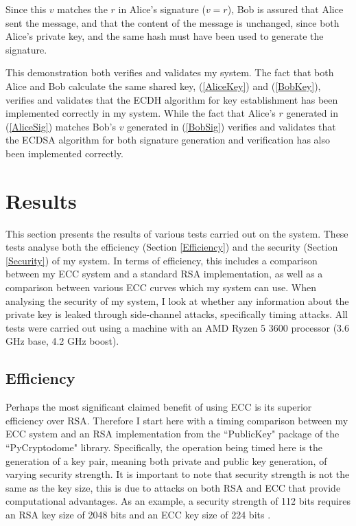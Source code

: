 \documentclass[12pt,a4paper]{article}
\begin{document}
Since this $v$ matches the $r$ in Alice's signature ($v=r$), 
Bob is assured that Alice sent the message, and that the content of the message is unchanged, 
since both Alice's private key, and the same hash must have been used to generate the signature. 

\vspace{5mm}

This demonstration both verifies and validates my system. 
The fact that both Alice and Bob calculate the same shared key, (\ref{AliceKey}) and (\ref{BobKey}), 
verifies and validates that the ECDH algorithm for key establishment has been implemented correctly in my system. 
While the fact that Alice's $r$ generated in (\ref{AliceSig}) matches Bob's $v$ generated in (\ref{BobSig}) 
verifies and validates that the ECDSA algorithm for both signature generation and verification has also been implemented correctly. 


\section{Results} \noindent \label{Results}
This section presents the results of various tests carried out on the system. 
These tests analyse both the efficiency (Section \ref{Efficiency}) and the security (Section \ref{Security}) of my system. 
In terms of efficiency, this includes a comparison between my ECC system and a standard RSA implementation, 
as well as a comparison between various ECC curves which my system can use. 
When analysing the security of my system, I look at whether any information about the private key is leaked through side-channel attacks, 
specifically timing attacks. 
All tests were carried out using a machine with an AMD Ryzen 5 3600 processor (3.6 GHz base, 4.2 GHz boost). 

\subsection{Efficiency} \noindent \label{Efficiency}
Perhaps the most significant claimed benefit of using ECC is its superior efficiency over RSA. 
Therefore I start here with a timing comparison between my ECC system and an RSA implementation 
from the ``PublicKey" package of the ``PyCryptodome" library. 
Specifically, the operation being timed here is the generation of a key pair, meaning both private and public key generation, 
of varying security strength. 
It is important to note that security strength is not the same as the key size, this is due to attacks on both RSA and ECC that provide computational advantages. 
As an example, a security strength of 112 bits requires an RSA key size of 2048 bits and an ECC key size of 224 bits \cite[p54-55]{barker2020recommendation}. 
\end{document}
